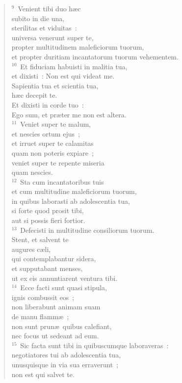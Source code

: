 \begin{flushleft}
\begin{verse}
${}^{9}$~Venient tibi duo h\ae c\\ subito in die una,\\ sterilitas et viduitas~:\\ universa venerunt super te,\\ propter multitudinem maleficiorum tuorum,\\ et propter duritiam incantatorum tuorum vehementem.\\
${}^{10}$~Et fiduciam habuisti in malitia tua,\\ et dixisti~: Non est qui videat me.\\ Sapientia tua et scientia tua,\\ h\ae c decepit te.\\ Et dixisti in corde tuo~:\\ Ego sum, et pr\ae ter me non est altera.\\
${}^{11}$~Veniet super te malum,\\ et nescies ortum ejus~;\\ et irruet super te calamitas\\ quam non poteris expiare~;\\ veniet super te repente miseria\\ quam nescies.\\
${}^{12}$~Sta cum incantatoribus tuis\\ et cum multitudine maleficiorum tuorum,\\ in quibus laborasti ab adolescentia tua,\\ si forte quod prosit tibi,\\ aut si possis fieri fortior.\\
${}^{13}$~Defecisti in multitudine consiliorum tuorum.\\ Stent, et salvent te\\ augures c\ae li,\\ qui contemplabantur sidera,\\ et supputabant menses,\\ ut ex eis annuntiarent ventura tibi.\\
${}^{14}$~Ecce facti sunt quasi stipula,\\ ignis combussit eos~;\\ non liberabunt animam suam\\ de manu flamm\ae~;\\ non sunt prun\ae\ quibus calefiant,\\ nec focus ut sedeant ad eum.\\
${}^{15}$~Sic facta sunt tibi in quibuscumque laboraveras~:\\ negotiatores tui ab adolescentia tua,\\ unusquisque in via sua erraverunt~;\\ non est qui salvet te.\end{verse}\end{flushleft}


